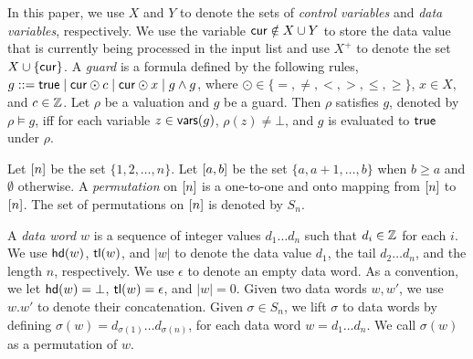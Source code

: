 In this paper, we use $X$ and $Y$ to denote the sets of \emph{control variables} and \emph{data variables}, respectively. We use the variable $\mathsf{cur} \notin X\cup Y$ to store the data value that is currently being processed in the input list and use $X^+$ to denote the set $X\cup \{\mathsf{cur}\}$.
A \emph{guard} is a formula defined by the following rules, $g::= \mathsf{true} \mid \mathsf{cur}\odot c \mid \mathsf{cur}\odot x \mid g \wedge g$, where $\odot \in \{=,\neq,<, >, \le, \ge\}$, $x \in X$, and $c\in {\mathbb{Z} }$. 
Let $\rho$ be a valuation and $g$ be a guard. Then $\rho$ satisfies $g$, denoted by $\rho \models g$, iff for each variable $z \in \mathsf{vars}(g)$, $\rho(z) \neq \bot$, and $g$ is evaluated to $\mathsf{true}$ under $\rho$. 

Let $[n]$ be the set $\{ 1, 2, \ldots, n \}$. Let $[a,b]$ be the set $\{ a, a+1, \ldots, b \}$ when $b\geq a$ and $\emptyset$ otherwise. A \emph{permutation} on
$[n]$ is a one-to-one and onto mapping from $[n]$ to
$[n]$. The set of
permutations on $[n]$ is denoted by $S_n$.

A \emph{data word $w$} is a sequence of integer values $d_1\ldots d_n$ such that $d_i \in {\mathbb{Z} }$ for each $i$.
We use $\mathsf{hd}(w)$, $\mathsf{tl}(w)$, and $|w|$ to denote the data value $d_1$, the tail $d_2\dots d_n$, and the length $n$, respectively.
We use $\epsilon$ to denote an empty data word. As a convention, we let $\mathsf{hd}(w)=\bot$, $\mathsf{tl}(w)=\epsilon$, and $|w|=0$.
Given two data words $w,w'$, we use $w.w'$ to denote their concatenation.
Given $\sigma \in S_n$, we lift $\sigma$ to data words by defining $\sigma(w)=d_{\sigma(1)} \ldots d_{\sigma(n)}$, for each data word $w=d_1\ldots d_n$. We call $\sigma(w)$ as a permutation of $w$.